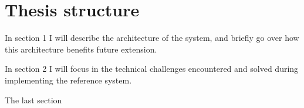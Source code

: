 \section{Thesis structure}
In section 1 I will describe the architecture of the system, and briefly go over how this architecture benefits future extension.

In section 2 I will focus in the technical challenges encountered and solved during implementing the reference system.

The last section

